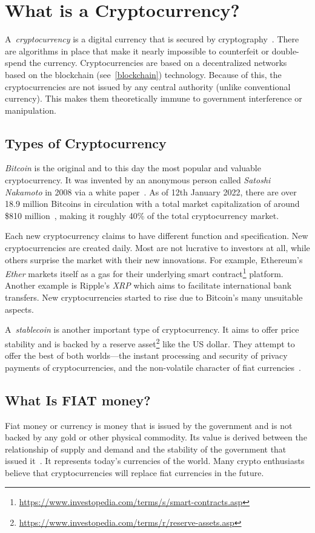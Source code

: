 \section{What is a Cryptocurrency?}
A~\emph{cryptocurrency} is a digital currency that is secured by cryptography~\cite{investopedia-cryptocurrency}. There are algorithms in place that make it nearly impossible to counterfeit or double-spend the currency. Cryptocurrencies are based on a decentralized networks based on the blockchain (see~\ref{blockchain}) technology. Because of this, the cryptocurrencies are not issued by any central authority (unlike conventional currency). This makes them theoretically immune to government interference or manipulation.

\subsection*{Types of Cryptocurrency}
\emph{Bitcoin} is the original and to this day the most popular and valuable cryptocurrency. It was invented by an anonymous person called \emph{Satoshi Nakamoto} in 2008 via a white paper~\cite{satoshi}. As of 12th January 2022, there are over 18.9 million Bitcoins in circulation with a total market capitalization of around \$810 million~\cite{coinmarketcap}, making it roughly 40\% of the total cryptocurrency market.

Each new cryptocurrency claims to have different function and specification. New cryptocurrencies are created daily. Most are not lucrative to investors at all, while others surprise the market with their new innovations. For example, Ethereum's \emph{Ether} markets itself as a gas for their underlying smart contract\footnote{\url{https://www.investopedia.com/terms/s/smart-contracts.asp}} platform. Another example is Ripple's \emph{XRP} which aims to facilitate international bank transfers. New cryptocurrencies started to rise due to Bitcoin's many unsuitable aspects.

\label{stablecoins-ref}
A~\emph{stablecoin} is another important type of cryptocurrency. It aims to offer price stability and is backed by a reserve asset\footnote{\url{https://www.investopedia.com/terms/r/reserve-assets.asp}} like the US dollar. They attempt to offer the best of both worlds---the instant processing and security of privacy payments of cryptocurrencies, and the non-volatile character of fiat currencies~\cite{investopedia-stablecoin}.

\subsection*{What Is FIAT money?}
﻿Fiat money or currency is money that is issued by the government and is not backed by any gold or other physical commodity. Its value is derived between the relationship of supply and demand and the stability of the government that issued it~\cite{investopedia-fiat}. It represents today's currencies of the world. Many crypto enthusiasts believe that cryptocurrencies will replace fiat currencies in the future.

